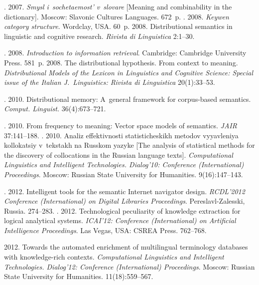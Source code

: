 \begin{multicols}{2}
{{\begin{thebibliography}{99}
. 2007. \textit{Smysl
i~sochetaemost' v~slovare} [Meaning and combinability in the dictionary].
Moscow: Slavonic Cultures Languages. 672~p.
. 2008. \textit{Keywen category structure}.
Wordclay, USA. 60~p.
 2008. Distributional semantics in linguistic and cognitive research.
\textit{Rivista di Linguistica} 2:1--30.

. 2008.
\textit{Introduction to information retrieval}. Cambridge: Cambridge University
Press. 581~p.
 2008. The distributional hypothesis. From context to meaning.
\textit{Distributional Models of the Lexicon in Linguistics and Cognitive Science:
Special issue of the Italian J.~Linguistics: Rivista di Linguistica} 20(1):33--53.

. 2010. Distributional memory: A~general
framework for corpus-based semantics. \textit{Comput. Linguist.}
36(4):673--721.

. 2010. From frequency to meaning: Vector
space models of semantics. \textit{JAIR}
37:141--188.
. 2010. Analiz effektivnosti
statisticheskikh metodov vyyavleniya kollokatsiy v~tekstakh na Russkom yazyke
[The analysis of statistical methods for the discovery of collocations in the Russian
language texts].  \textit{Computational Linguistics and Intelligent Technologies.
Dialog'10: Conference (International) Proceedings}.  Moscow: Russian State
University for Humanities. 9(16):147--143.

. 2012. Intelligent tools for the
semantic Internet navigator design. \textit{RCDL'2012 Conference (International)
on Digital Libraries Proceedings}. Pereslavl-Zalesski, Russia. 274--283.
. 2012.
Technological peculiarity of knowledge extraction for logical analytical systems.
\textit{ICAI'12: Conference (International) on Artificial Intelligence
Proceedings}. Las Vegas, USA: CSREA Press. 762--768.

 2012. Towards the automated enrichment of multilingual
terminology databases with knowledge-rich contexts. \textit{Computational
Linguistics and Intelligent Technologies. Dialog'12: Conference (International)
Proceedings}.    Moscow: Russian State University for Humanities.
11(18):559--567.


\end{thebibliography}}}
\end{multicols}
